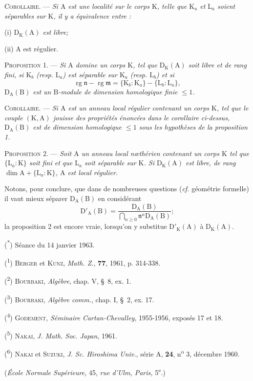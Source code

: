 
\textsc{Corollaire.} --- \textit{Si $\mathrm A$ est une localité sur le corps $\mathrm K$, telle que $\mathrm K_a$ et $\mathrm L_a$ soient séparables sur $\mathrm K$, il y a équivalence entre :}

(i) \textit{$\mathrm D_{\mathrm K}(\mathrm A)$ est libre;}

(ii) $\mathrm A$ est régulier.

\textsc{Proposition 1.} --- \textit{Si $\mathrm A$ domine un corps $\mathrm K$, tel que $\mathrm D_{\mathrm K}(\mathrm A)$ soit libre et de rang fini, si $\mathrm K_b$ (resp. $\mathrm L_a$) est séparable sur $\mathrm K_a$ (resp. $\mathrm L_b$) et si}
\[
\operatorname{rg}\mathfrak n-\operatorname{rg}\mathfrak m=\{\mathrm K_b:\mathrm K_a\}-\{\mathrm L_b:\mathrm L_a\},
\]
\textit{$\mathrm D_{\mathrm A}(\mathrm B)$ est un $\mathrm B$-module de dimension homologique finie $\leq1$.}

\textsc{Corollaire.} --- \textit{Si $\mathrm A$ est un anneau local régulier contenant un corps $\mathrm K$, tel que le couple $(\mathrm K,\mathrm A)$ jouisse des propriétés énoncées dans le corollaire ci-dessus, $\mathrm D_{\mathrm A}(\mathrm B)$ est de dimension homologique $\leq1$ sous les hypothèses de la proposition 1.}

\textsc{Proposition 2.} --- \textit{Soit $\mathrm A$ un anneau local nœthérien contenant un corps $\mathrm K$ tel que $\{\mathrm L_a:\mathrm K\}$ soit fini et que $\mathrm L_a$ soit séparable sur $\mathrm K$. Si $\mathrm D_{\mathrm K}(\mathrm A)$ est libre, de rang $\dim\mathrm A+\{\mathrm L_a:\mathrm K\}$, $\mathrm A$ est local régulier.}

Notons, pour conclure, que dans de nombreuses questions (\textit{cf.} géométrie formelle) il vaut mieux séparer $\mathrm D_{\mathrm A}(\mathrm B)$ en considérant
\[
\mathrm D'_{\mathrm A}(\mathrm B)=\frac{\mathrm D_{\mathrm A}(\mathrm B)}{\displaystyle\bigcap_{n\geq0}\mathfrak n^n\mathrm D_{\mathrm A}(\mathrm B)};
\]
la proposition 2 est encore vraie, lorsqu’on y substitue $\mathrm D'_{\mathrm K}(\mathrm A)$ à $\mathrm D_{\mathrm K}(\mathrm A)$.

(\textsuperscript{*}) Séance du 14 janvier 1963.

(\textsuperscript{1}) \textsc{Berger} et \textsc{Kunz}, \textit{Math. Z.}, \textbf{77}, 1961, p. 314-338.

(\textsuperscript{2}) \textsc{Bourbaki}, \textit{Algèbre}, chap. V, \S~8, ex. 1.

(\textsuperscript{3}) \textsc{Bourbaki}, \textit{Algèbre comm.}, chap. I, \S~2, ex. 17.

(\textsuperscript{4}) \textsc{Godement}, \textit{Séminaire Cartan-Chevalley}, 1955-1956, exposés 17 et 18.

(\textsuperscript{5}) \textsc{Nakai}, \textit{J. Math. Soc. Japan}, 1961.

(\textsuperscript{6}) \textsc{Nakai} et \textsc{Suzuki}, \textit{J. Sc. Hiroshima Univ.}, série A, \textbf{24}, n\textsuperscript{o} 3, décembre 1960.

\hfill(\textit{École Normale Supérieure,} 45, \textit{rue d’Ulm, Paris,} 5\textsuperscript{e}.)
